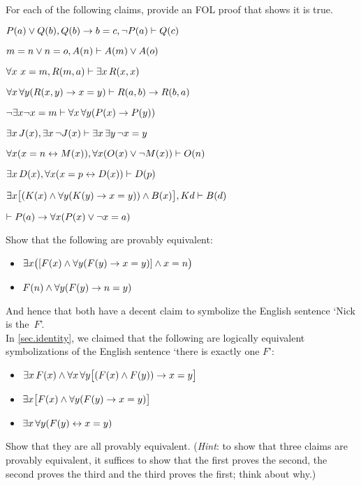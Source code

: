 \practiceproblems
\problempart
\label{pr.identity}
For each of the following claims, provide an FOL proof that shows it
is true.
\begin{compactlist}
\item $P(a) \vee Q(b), Q(b) \rightarrow b=c, \neg P(a) \vdash Q(c)$
\item $m=n \vee n=o, A(n) \vdash A(m) \vee A(o)$
\item $\forall x\ x=m, R(m,a) \vdash \exists x\,R(x,x)$
\item $\forall x\,\forall y(R(x,y) \rightarrow x=y)\vdash R(a,b) \rightarrow R(b,a)$
\item $\neg \exists x\neg x = m \vdash \forall x\,\forall y (P(x) \rightarrow P(y))$
\item $\exists x\,J(x), \exists x\, \neg J(x)\vdash \exists x\, \exists y\, \neg x = y$
\item $\forall x(x=n \leftrightarrow M(x)), \forall x(O(x) \vee \neg M(x))\vdash O(n)$
\item $\exists x\,D(x), \forall x(x=p \leftrightarrow D(x))\vdash D(p)$
\item $\exists x\bigl[(K(x) \wedge \forall y(K(y) \rightarrow x=y)) \wedge B(x)\bigr], Kd\vdash B(d)$
\item $\vdash P(a) \rightarrow \forall x(P(x) \vee \neg x = a)$
\end{compactlist}

\problempart
Show that the following are provably equivalent:
\begin{itemize}
\item $\exists x \bigl([F(x) \wedge \forall y (F(y) \rightarrow x = y)] \wedge x = n\bigr)$
\item $F(n) \wedge \forall y (F(y) \rightarrow n= y)$
\end{itemize}
And hence that both have a decent claim to symbolize the English sentence `Nick is the~$F$'.\\

\problempart
In \cref{sec.identity}, we claimed that the following are logically equivalent symbolizations of the English sentence `there is exactly one $F$':
\begin{itemize}
\item $\exists x\,F(x) \wedge \forall x\, \forall y \bigl[(F(x) \wedge F(y)) \rightarrow x = y\bigr]$
\item $\exists x \bigl[F(x) \wedge \forall y (F(y) \rightarrow x = y)\bigr]$
\item $\exists x\, \forall y (F(y) \leftrightarrow x = y)$
\end{itemize}
Show that they are all provably equivalent. (\emph{Hint}: to show that three claims are provably equivalent, it suffices to show that the first proves the second, the second proves the third and the third proves the first; think about why.)


